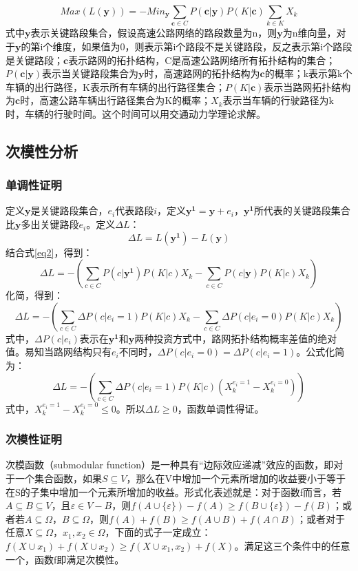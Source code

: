 			\begin{equation}
			Max(L(\bm{y})) = -Mi{n_{\bm{y} }}\sum\limits_{\bm{c} \in C} {P(\bm{c}|\bm{y} )} P(K|\bm{c})\sum\limits_{k \in K} {{X_k}} 
			\label{eq3}
			\end{equation}
			式中$\bm{y} $表示关键路段集合，假设高速公路网络的路段数量为n，则$\bm{y} $为n维向量，对于$\bm{y} $的第i个维度，如果值为0，则表示第i个路段不是关键路段，反之表示第i个路段是关键路段；$\bm{c}$表示路网的拓扑结构，C是高速公路网络所有拓扑结构的集合；${P(\bm{c}|\bm{y} )}$表示当关键路段集合为$\bm{y} $时，高速路网的拓扑结构为$\bm{c}$的概率；k表示第k个车辆的出行路径，K表示所有车辆的出行路径集合；$P(K|\bm{c})$表示当路网拓扑结构为$\bm{c}$时，高速公路车辆出行路径集合为K的概率；${{X_k}}$表示当车辆的行驶路径为k时，车辆的行驶时间。这个时间可以用交通动力学理论求解\parencite{Chen2012Identifying}。

			\subsection{次模性分析}
			\subsubsection{单调性证明}
				定义$\bm{y}$是关键路段集合，$e_i$代表路段$i$，定义$\bm{y^1}=\bm{y}+e_i$，$\bm{y^1}$所代表的关键路段集合比$\bm{y}$多出关键路段$e_i$。定义$\Delta L$：
				$$\Delta L=L(\bm{y^1})-L(\bm{y})$$
				结合式\ref{eq2}，得到：
				$$\Delta L=-(\sum\limits_{c \in C} {P(c|{\bm{y^1}})P(K|c){X_k} - } \sum\limits_{c \in C} {P(c|\bm{y})P(K|c){X_k}}) $$
				化简，得到：
				$$\Delta L=-(\sum\limits_{c\in C} {\Delta P(c|{e_i}=1)P(K|c){X_k}}  - \sum\limits_{c\in C} {\Delta P(c|{e_i}=0)P(K|c){X_k}}) $$
				式中，$\Delta P(c|{e_i})$表示在$\bm{y^1}$和$\bm{y}$两种投资方式中，路网拓扑结构概率差值的绝对值。易知当路网结构只有$e_i$不同时，$\Delta P(c|{e_i=0})=\Delta P(c|e_i=1)$。公式化简为：
				$$\Delta L=-(\sum\limits_{c\in C} {\Delta P(c|{e_i=1})P(K|c)(X_k^{e_i=1}-X_k^{e_i=0})})$$
				式中，$X_k^{e_i=1}-X_k^{e_i=0}\leqslant 0$。所以$\Delta L\geqslant 0$，函数单调性得证。
			\subsubsection{次模性证明}
			次模函数（submodular function）是一种具有“边际效应递减”效应的函数，即对于一个集合函数，如果$S \subseteq V$，那么在V中增加一个元素所增加的收益要小于等于在S的子集中增加一个元素所增加的收益。形式化表述就是：对于函数f而言，若$A \subseteq B \subseteq V$，且$\varepsilon  \in V - B$，则$f(A \cup \{ \varepsilon \} ) - f(A) \ge f(B \cup \{ \varepsilon \} ) - f(B)$；或者若$A \subseteq \Omega，B \subseteq \Omega$，则$f(A) + f(B) \ge f(A\mathop  \cup \nolimits B) + f(A\mathop  \cap \nolimits B)$；或者对于任意$X \subseteq \Omega，x_1,x_2 \in \Omega$，下面的式子一定成立：$f(X \cup {x_1}) + f(X \cup {x_2}) \ge f(X \cup {x_1},{x_2}) + f(X)$。满足这三个条件中的任意一个，函数f即满足次模性。


